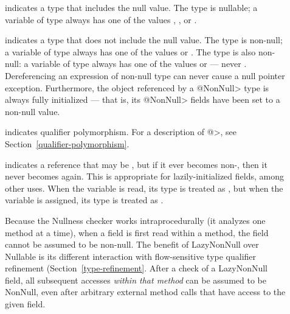 \begin{description}

\item[]
  indicates a type that includes the null value.  The type 
  is nullable; a variable of type  always has one of the
  values , , or .

\item[]
  indicates a type that does not include the null value.  The type
   is non-null; a variable of type  always has
  one of the values  or .  The type  is also non-null:  a variable of type 
  always has one of the values  or  --- never
  .  Dereferencing an expression of non-null type can never cause
  a null pointer exception.
  Furthermore, the object referenced by a \<@NonNull> type is always fully
  initialized --- that is, its \<@NonNull> fields have been set to a
  non-null value.

\item[]
  indicates qualifier polymorphism.  For a description of
  \<@>, see
  Section~\ref{qualifier-polymorphism}.

\item[]
  indicates a reference that may be , but if it ever becomes
  non-, then it never becomes  again.  This is
  appropriate for lazily-initialized fields, among other uses.  When the
  variable is read, its type is treated as
  , but when the variable is
  assigned, its type is treated as
  .

  Because the Nullness checker works intraprocedurally (it analyzes one
  method at a time), when a  field is first read within a
  method, the field cannot be assumed to be non-null.  The benefit of
  LazyNonNull over Nullable is its different interaction with
  flow-sensitive type qualifier refinement (Section~\ref{type-refinement}.
  After a check of a LazyNonNull
  field, all subsequent accesses \emph{within that method} can be assumed
  to be NonNull, even after arbitrary external method calls that have
  access to the given field.

\end{description}

